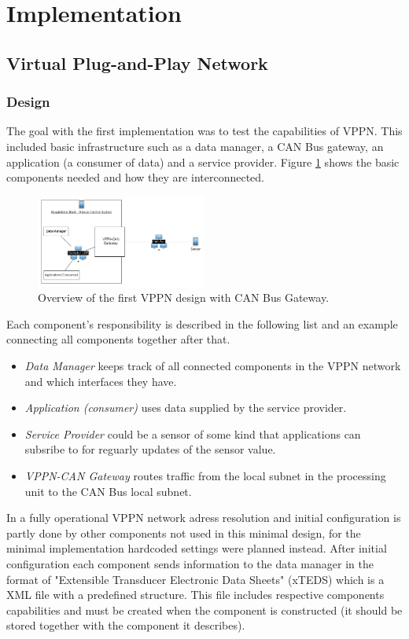 \section{Implementation}\label{sec:implementation}
\subsection{Virtual Plug-and-Play Network}
\subsubsection{Design}
The goal with the first implementation was to test the capabilities of VPPN.
This included basic infrastructure such as a data manager, a CAN Bus
gateway, an application (a consumer of data) and a service provider. Figure
\ref{fig:vppn-overview} shows the basic components needed and how they are
interconnected.

\begin{figure}[h]
    \includegraphics[width=0.5\textwidth]{./figure/vppn-overview.png}
    \caption{Overview of the first VPPN design with CAN Bus Gateway.}
    \label{fig:vppn-overview}
\end{figure}

Each component's responsibility is described in the following list and an
example connecting all components together after that.
\begin{itemize}
    \item {\em Data Manager} keeps track of all connected components in the VPPN
        network and which interfaces they have.
    \item {\em Application (consumer)} uses data supplied by the service
        provider.
    \item {\em Service Provider} could be a sensor of some kind that
        applications can subsribe to for reguarly updates of the sensor value.
    \item {\em VPPN-CAN Gateway} routes traffic from the local subnet in the
        processing unit to the CAN Bus local subnet.
\end{itemize}

In a fully operational VPPN network adress resolution and initial
configuration is partly done by other components not used in this minimal
design, for the minimal implementation hardcoded settings were planned instead.
After initial configuration each component sends information to the
data manager in the format of "Extensible Transducer Electronic Data Sheets"
(xTEDS) which is a XML file with a predefined structure. This file includes
respective components capabilities and must be created when the component is
constructed (it should be stored together with the component it describes).

